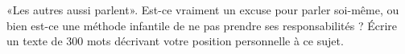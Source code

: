 
\begin{exercice}\label{exosmath-0455}

    «Les autres aussi parlent». Est-ce vraiment un excuse pour parler soi-même, ou bien est-ce une méthode infantile de ne pas prendre ses responsabilités ? Écrire un texte de 300 mots décrivant votre position personnelle à ce sujet.

\end{exercice}
